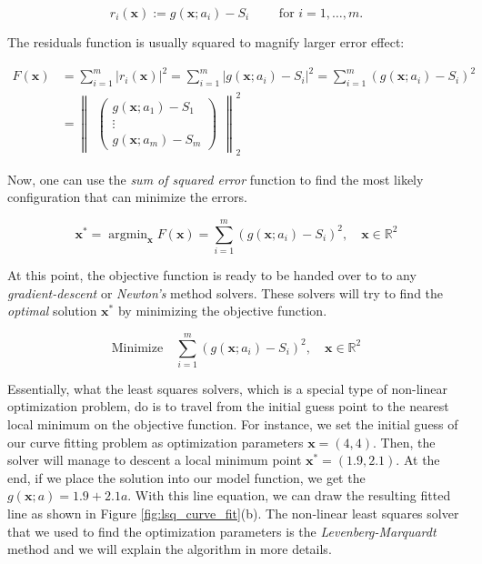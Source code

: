 \documentclass[a4paper]{report}
\numberwithin{figure}{section}
\newcommand{\argmin}{\mathop{\mathrm{argmin}}}
\newcommand{\R}{\mathbb{R}}
\begin{document}
\begin{appendices}
\begin{equation}
  r_i(\mathbf{x}) := g(\mathbf{x};a_i) - S_i \qquad \text{ for }  i = 1,\dots,m.
\label{eq:}
\end{equation}

The residuals function is usually squared to magnify larger error effect:

\begin{equation}
\begin{aligned}
  F(\mathbf{x}) & = \sum_{i=1}^{m} \vert r_i(\mathbf{x}) \vert^2 = 
  \sum_{i=1}^{m} \vert g(\mathbf{x};a_i) - S_i \vert^2 =
  \sum_{i=1}^{m} (g(\mathbf{x};a_i) - S_i)^2 \\
& = \begin{Vmatrix}
  \begin{pmatrix} g(\mathbf{x};a_1) - S_1 \\ \vdots \\ g(\mathbf{x};a_m) - S_m \end{pmatrix} 
\end{Vmatrix}_2^2
\label{eq}
\end{aligned}
\end{equation}

Now, one can use the \textit{sum of squared error} function to find the most likely
configuration that can minimize the errors. 

\begin{equation}
  \mathbf{x}^* = \argmin_{\mathbf{x}} F(\mathbf{x}) = 
  \sum_{i=1}^{m} (g(\mathbf{x};a_i) - S_i)^2, 
  \quad \mathbf{x} \in \R^2
\label{eq}
\end{equation}

At this point, the objective function is ready to be handed over to 
to any \textit{gradient-descent} or 
\textit{Newton's} method solvers.
These solvers will try to find the
\textit{optimal} solution $\mathbf{x}^*$ by minimizing the objective function.

\begin{equation}
  \text{Minimize} \quad \sum_{i=1}^{m} (g(\mathbf{x};a_i) - S_i)^2, 
\quad \mathbf{x} \in \R^2
\label{eq}
\end{equation}

Essentially, what the least squares solvers, which is a special type of 
non-linear optimization problem, 
do is to travel from the initial guess point to the nearest local minimum 
on the objective function. 
For instance, we set  
the initial guess of our curve fitting problem 
as optimization parameters $\mathbf{x}=(4,4)$. 
Then, the solver will 
manage to descent a local minimum point 
$\mathbf{\mathbf{x^*}}=(1.9,2.1)$. 
At the end, if we place the solution into our model function, we
get the $g(\mathbf{x};a)=1.9+2.1a$. With this line equation, we can draw the resulting fitted line 
as shown in Figure \ref{fig:lsq_curve_fit}(b).
The non-linear least squares solver that we used to find the optimization 
parameters is the \textit{Levenberg-Marquardt} method and we will explain 
the algorithm in more details.


\end{appendices}
\end{document}

